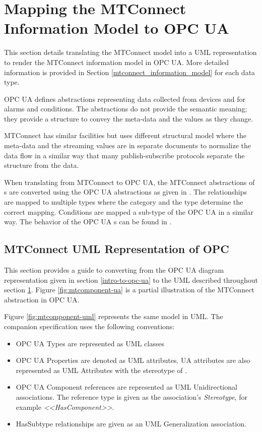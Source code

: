 \section{Mapping the MTConnect Information Model to OPC UA} 
  \label{mtconnect-mapping}

This section details translating the MTConnect model into a UML representation to render the MTConnect information model in OPC UA. More detailed information is provided in Section \ref{mtconnect_information_model} for each data type.

OPC UA defines abstractions representing data collected from devices and for alarms and conditions. The abstractions do not provide the semantic meaning; they provide a structure to convey the meta-data and the values as they change. 

MTConnect has similar facilities but uses different structural model where the meta-data and the streaming values are in separate documents to normalize the data flow in a similar way that many publish-subscribe protocols separate the structure from the data.

When translating from MTConnect to OPC UA, the MTConnect abstractions of s are converted using the OPC UA   abstractions as given in \cite{UAPart8}.  The relationships are mapped to multiple  types where the category and the type determine the correct mapping. Conditions are mapped a sub-type of the OPC UA  in a similar way. The behavior of the OPC UA s can be found in \cite{UAPart9}.

\subsection{MTConnect UML Representation of OPC}

This section provides a guide to converting from the OPC UA diagram representation given in section \ref{intro-to-opc-ua} to the UML described throughout section \ref{mtconnect-mapping}. Figure \ref{fig:mtcomponent-ua} is a partial illustration of the MTConnect  abstraction in OPC UA.



Figure \ref{fig:mtcomponent-uml} represents the same model in UML. The companion specification uses the following conventions:

\begin{itemize}
\item OPC UA Types are represented as UML classes
\item OPC UA Properties are denoted as UML attributes. UA attributes are also represented as UML Attributes with the stereotype of .
\item OPC UA Component references are represented as UML Unidirectional associations. The reference type is given as the association's \textit{Stereotype}, for example \textit{<<HasComponent>>}. 
\item HasSubtype relationships are given as an UML Generalization association.  
\end{itemize}

